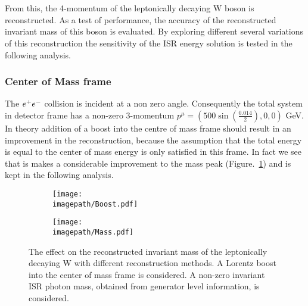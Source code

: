\\\\
From this, the 4-momentum of the leptonically decaying W boson is reconstructed. As a test of performance, the accuracy of the reconstructed invariant mass of this boson is evaluated. By exploring different several variations of this reconstruction the sensitivity of the ISR energy solution is tested in the following analysis.

\subsubsection{Center of Mass frame}
\label{SUBSUBSEC:CenterOfMassFrame}
The $e^{+}e^{-}$ collision is incident at a non zero angle. Consequently the total system in detector frame has a non-zero 3-momentum $ {p}^{\mu} = ( 500 \sin{(\frac{0.014}{2})}, 0, 0 )$ GeV. In theory addition of a boost into the centre of mass frame should result in an improvement in the reconstruction, because the assumption that the total energy is equal to the center of mass energy is only satisfied in this frame. In fact we see that is makes a considerable improvement to the mass peak (Figure.~\ref{SUBFIG:Boost}) and is kept in the following analysis.

\begin{figure}[!]
  \centering
  \begin{subfigure}[t]{0.45\textwidth}
    \centering
    \texttt{[image: \\imagepath/Boost.pdf]}
    \caption{}
    \label{SUBFIG:Boost}
  \end{subfigure}
  \begin{subfigure}[t]{0.45\textwidth}
    \centering
    \texttt{[image: \\imagepath/Mass.pdf]}
    \caption{}
    \label{SUBFIG:MassFig}
  \end{subfigure}
  \caption{
    The effect on the reconstructed invariant mass of the leptonically decaying W with different reconstruction methods.
     A Lorentz boost into the center of mass frame is considered.
     A non-zero invariant ISR photon mass, obtained from generator level information, is considered.
    }
  \label{FIG:BoostMass}
\end{figure}

